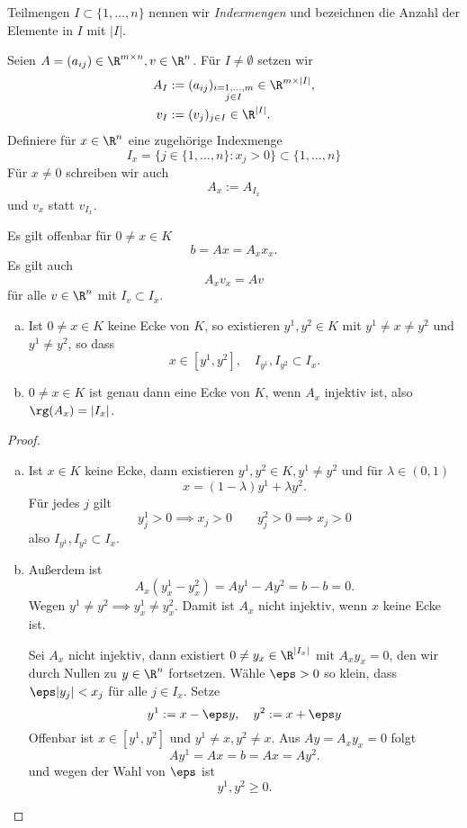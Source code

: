 \begin{df} \label{3.5}
	Teilmengen $I \subset \{1, \dotsc, n\}$ nennen wir \emph{Indexmengen} und bezeichnen die Anzahl der Elemente in $I$ mit $|I|$.

	Seien $A = (a_{ij}) \in \R^{m\times n}, v \in \R^n$.
	Für $I \neq \emptyset$ setzen wir
	\begin{align*}
		A_I &:= (a_{ij})_{\substack{i=1,\dotsc,m \\ j \in I}}
			\in \R^{m\times |I|}, \\
		v_I &:= (v_j)_{j\in I}
			\in \R^{|I|}.
	\end{align*}
	Definiere für $x \in \R^n$ eine zugehörige Indexmenge
	\[
		I_x = \Big\{ j \in \{1, \dotsc, n\} : x_j > 0 \Big\}
		\subset \{1, \dotsc, n\}
	\]
	Für $x \neq 0$ schreiben wir auch
	\[
		A_x := A_{I_x}
	\]
	und $v_x$ statt $v_{I_x}$.
	\begin{note}
		Es gilt offenbar für $0 \neq x \in K$
		\[
			b = Ax = A_x x_x.
		\]
		Es gilt auch
		\[
			A_x v_x = A v
		\]
		für alle $v \in \R^n$ mit $I_v \subset I_x$.
	\end{note}
\end{df}

\begin{lem} \label{3.6}
	\begin{enumerate}[(a)]
		\item
			Ist $0 \neq x \in K$ keine Ecke von $K$, so existieren $y^1, y^2 \in K$ mit $y^1 \neq x \neq y^2$ und $y^1 \neq y^2$, so dass
			\[
				x \in [y^1, y^2], \quad I_{y^1}, I_{y^2} \subset I_x.
			\]
		\item
			$0 \neq x \in K$ ist genau dann eine Ecke von $K$, wenn $A_x$ injektiv ist, also $\rg(A_x) = |I_x|$.
	\end{enumerate}
	\begin{proof}
		\begin{enumerate}[(a)]
			\item
				Ist $x \in K$ keine Ecke, dann existieren $y^1, y^2 \in K, y^1 \neq y^2$ und für $\lambda \in (0,1)$
				\[
					x = (1-\lambda) y^1 + \lambda y^2.
				\]
				Für jedes $j$ gilt
				\[
					y_j^1 > 0 \implies x_j > 0 \qquad
					y_j^2 > 0 \implies x_j > 0
				\]
				also $I_{y^1}, I_{y^2} \subset I_x$.
			\item
				Außerdem ist
				\[
					A_x (y_x^1 - y_x^2)
					= Ay^1 - Ay^2
					= b - b = 0.
				\]
				Wegen $y^1 \neq y^2 \implies y_x^1 \neq  y_x^2$.
				Damit ist $A_x$ nicht injektiv, wenn $x$ keine Ecke ist.

				Sei $A_x$ nicht injektiv, dann existiert $0 \neq y_x \in \R^{|I_x|}$ mit $A_x y_x = 0$, den wir durch Nullen zu $y \in \R^n$ fortsetzen.
				Wähle $\eps > 0$ so klein, dass $\eps |y_j| < x_j$ für alle $j \in I_x$.
				Setze
				\[
					y^1 := x - \eps y,
					\quad
					y^2 := x + \eps y
				\]
				Offenbar ist $x \in [y^1, y^2]$ und $y^1 \neq x, y^2 \neq x$.
				Aus $Ay = A_x y_x = 0$ folgt
				\[
					Ay^1 = Ax = b = Ax = Ay^2.
				\]
				und wegen der Wahl von $\eps$ ist
				\[
					y^1, y^2 \ge 0.
				\]
		\end{enumerate}
	\end{proof}
\end{lem}

